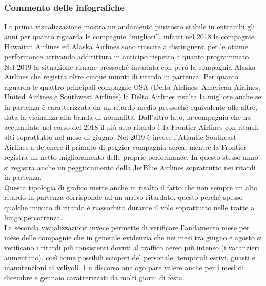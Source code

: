 \documentclass[12pt]{article}
\begin{document}
\subsubsection{Commento delle infografiche}
La prima visualizzazione mostra un andamento piuttosto stabile in entrambi gli anni per quanto riguarda le compagnie ``migliori'', infatti nel 2018 le compagnie Hawaiian Airlines ed Alaska Airlines sono riuscite a distinguersi per le ottime performance arrivando addirittura in  anticipo rispetto a quanto programmato. Nel 2019 la situazione rimane pressoché invariata con però la compagnia Alaska Airlines che registra oltre cinque minuti di ritardo in partenza. Per quanto riguarda le quattro principali compagnie USA (Delta Airlines, American Airlines, United Airlines e Southwest Airlines),la Delta Airlines risulta la migliore anche se in partenza è caratterizzata da un ritardo medio pressoché equivalente alle altre, data la vicinanza alla banda di normalità. 
Dall'altro lato, la compagnia che ha accumulato nel corso del 2018 il più alto ritardo è la Frontier Airlines con ritardi alti soprattutto nel mese di giugno. Nel 2019 è invece l'Atlantic Southeast Airlines a detenere il primato di peggior compagnia aerea, mentre la Frontier registra un netto miglioramento delle proprie performance. In questo stesso anno si registra anche un peggioramento della JetBlue Airlines soprattutto nei ritardi in partenza.\\
Questa tipologia di grafico mette anche in risalto il fatto che non sempre un alto ritardo in partenza corrisponde ad un arrivo ritardato, questo perché spesso qualche minuto di ritardo è riassorbito durante il volo soprattutto nelle tratte a lunga percorrenza.\\
La seconda visualizzazione invece permette di verificare l'andamento mese per mese delle compagnie che in generale evidenzia che nei mesi tra giugno e agosto si verificano i ritardi più consistenti dovuti al traffico aereo più intenso (i vacanzieri aumentano), così come  possibili scioperi del personale, temporali estivi, guasti e manutenzioni ai velivoli. Un discorso analogo pare valere anche per i mesi di dicembre e gennaio caratterizzati da molti giorni di festa.
\end{document}
